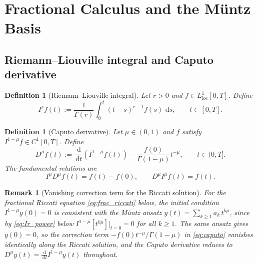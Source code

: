 \documentclass[11pt,a4paper]{article}
\newtheorem{definition}[theorem]{Definition}
\newtheorem{remark}[theorem]{Remark}
\newcommand{\dd}{\,\mathrm{d}}
\begin{document}
\tableofcontents

\section{Fractional Calculus and the M\"untz Basis}\label{sec:prelim}

\subsection{Riemann--Liouville integral and Caputo derivative}

\begin{definition}[Riemann--Liouville integral]\label{def:RL}
Let \(r>0\) and \(f\in L^1_{\mathrm{loc}}[0,T]\). Define
\begin{equation}\label{eq:RL_int}
I^r f(t) := \frac{1}{\Gamma(r)}\int_0^t (t-s)^{r-1} f(s)\,\dd s,\qquad t\in[0,T].
\end{equation}
\end{definition}

\begin{definition}[Caputo derivative]\label{def:Caputo}
Let \(\mu\in(0,1)\) and \(f\) satisfy \(I^{1-\mu}f\in C^1[0,T]\). Define
\begin{equation}\label{eq:caputo}
D^\mu f(t) := \frac{\dd}{\dd t}\!\left(I^{1-\mu}f(t)\right)
- \frac{f(0)}{\Gamma(1-\mu)}t^{-\mu},\qquad t\in(0,T].
\end{equation}
The fundamental relations are
\begin{equation}\label{eq:caputo_RL}
I^\mu D^\mu f(t) = f(t) - f(0),\qquad D^\mu I^\mu f(t)=f(t).
\end{equation}
\end{definition}

\begin{remark}[Vanishing correction term for the Riccati solution]\label{rem:correction}
For the fractional Riccati equation \eqref{eq:frac_riccati} below, the initial condition \(I^{1-\mu}y(0)=0\) is consistent with the M\"untz ansatz \(y(t)=\sum_{k\ge1}a_k\,t^{k\mu}\), since by \eqref{eq:Ir_power} below \(I^{1-\mu}[t^{k\mu}]\big|_{t=0}=0\) for all \(k\ge1\).
The same ansatz gives \(y(0)=0\), so the correction term \(-f(0)t^{-\mu}/\Gamma(1-\mu)\) in \eqref{eq:caputo} vanishes identically along the Riccati solution, and the Caputo derivative reduces to \(D^\mu y(t)=\frac{\dd}{\dd t}I^{1-\mu}y(t)\) throughout.
\end{remark}
\end{document}
